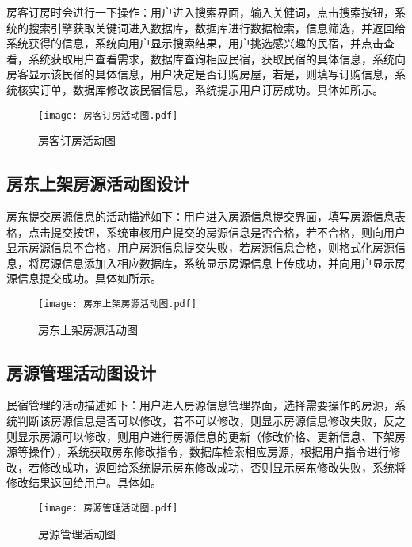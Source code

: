 \documentclass[lang=cn,11pt,a4paper,cite=authoryear]{elegantpaper}
\begin{document}
房客订房时会进行一下操作：用户进入搜索界面，输入关健词，点击搜索按钮，系统的搜索引擎获取关键词进入数据库，数据库进行数据检索，信息筛选，并返回给系统获得的信息，系统向用户显示搜索结果，用户挑选感兴趣的民宿，并点击查看，系统获取用户查看需求，数据库查询相应民宿，获取民宿的具体信息，系统向房客显示该民宿的具体信息，用户决定是否订购房屋，若是，则填写订购信息，系统核实订单，数据库修改该民宿信息，系统提示用户订房成功。具体如所示。

\begin{figure}[]
    \centering
    \texttt{[image: 房客订房活动图.pdf]}
    \caption{房客订房活动图}
    \label{fig:房客订房活动图}
\end{figure}

\subsection{房东上架房源活动图设计}

房东提交房源信息的活动描述如下：用户进入房源信息提交界面，填写房源信息表格，点击提交按钮，系统审核用户提交的房源信息是否合格，若不合格，则向用户显示房源信息不合格，用户房源信息提交失败，若房源信息合格，则格式化房源信息，将房源信息添加入相应数据库，系统显示房源信息上传成功，并向用户显示房源信息提交成功。具体如所示。

\begin{figure}[]
    \centering
    \texttt{[image: 房东上架房源活动图.pdf]}
    \caption{房东上架房源活动图}
    \label{fig:房东上架房源活动图}
\end{figure}

\subsection{房源管理活动图设计}

民宿管理的活动描述如下：用户进入房源信息管理界面，选择需要操作的房源，系统判断该房源信息是否可以修改，若不可以修改，则显示房源信息修改失败，反之则显示房源可以修改，则用户进行房源信息的更新（修改价格、更新信息、下架房源等操作），系统获取房东修改指令，数据库检索相应房源，根据用户指令进行修改，若修改成功，返回给系统提示房东修改成功，否则显示房东修改失败，系统将修改结果返回给用户。具体如。

\begin{figure}[]
    \centering
    \texttt{[image: 房源管理活动图.pdf]}
    \caption{房源管理活动图}
    \label{fig:房源管理活动图}
\end{figure}
\end{document}
